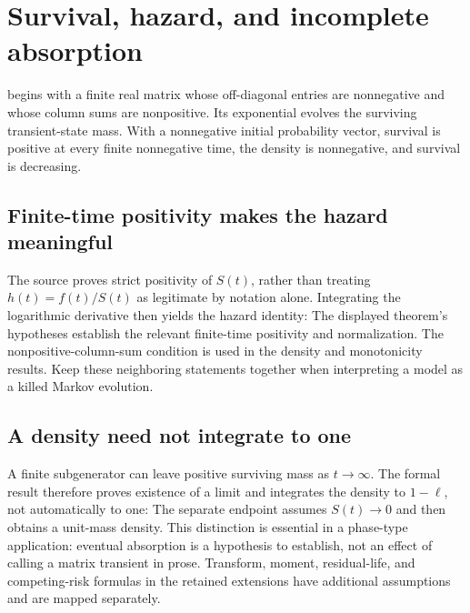 \clearpage\section{Survival, hazard, and incomplete absorption}
\label{sec:survival}
 begins with a finite real matrix whose off-diagonal entries are nonnegative and whose column sums are nonpositive. Its exponential evolves the surviving transient-state mass. With a nonnegative initial probability vector, survival is positive at every finite nonnegative time, the density is nonnegative, and survival is decreasing.

\subsection{Finite-time positivity makes the hazard meaningful}
The source proves strict positivity of $S(t)$, rather than treating $h(t)=f(t)/S(t)$ as legitimate by notation alone. Integrating the logarithmic derivative then yields the hazard identity:
The displayed theorem's hypotheses establish the relevant finite-time positivity and normalization. The nonpositive-column-sum condition is used in the density and monotonicity results. Keep these neighboring statements together when interpreting a model as a killed Markov evolution.

\subsection{A density need not integrate to one}
A finite subgenerator can leave positive surviving mass as $t\to\infty$. The formal result therefore proves existence of a limit and integrates the density to $1-\ell$, not automatically to one:
The separate  endpoint assumes $S(t)\to0$ and then obtains a unit-mass density. This distinction is essential in a phase-type application: eventual absorption is a hypothesis to establish, not an effect of calling a matrix transient in prose. Transform, moment, residual-life, and competing-risk formulas in the retained extensions have additional assumptions and are mapped separately.
